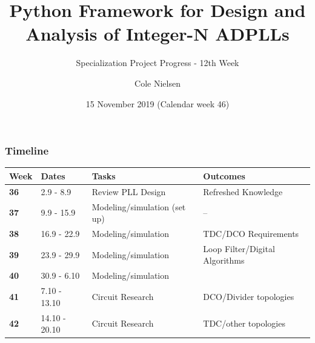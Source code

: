 \documentclass[t, screen, aspectratio=43]{beamer}
\title[Short title]{Python Framework for Design and Analysis of Integer-N ADPLLs}
\subtitle{Specialization Project Progress - 12th Week}
\author[C Nielsen]{Cole Nielsen}
\institute[NTNU]{Department of Electronic Systems, NTNU}
\date{15 November 2019 (Calendar week 46)}
\begin{document}
\begin{frame}
	\titlepage%
\end{frame}



\begin{frame}
	\frametitle{Timeline}
	\begin{table}[htb!]
		\tiny
		\centering
		\vspace{-1em}
		\def\arraystretch{1.5}		
		\setlength\arrayrulewidth{0.75pt}
		\setlength{\tabcolsep}{1em} %
		\begin{tabular}{|l|l|l|l|}
			\hline 
			\rule[-1ex]{0pt}{2.5ex} \cellcolor{gray!40}\textbf{Week} & \cellcolor{gray!40}\textbf{Dates} &\cellcolor{gray!40}\textbf{Tasks} & \cellcolor{gray!40}\textbf{Outcomes}\\ 
			\hline 
			\rule[-1ex]{0pt}{2.5ex} \cellcolor{red!20}\textbf{36}& \cellcolor{red!20}2.9 - 8.9 & \cellcolor{red!20}Review PLL Design & \cellcolor{red!20}Refreshed Knowledge\\ 
			\hline 
			\rule[-1ex]{0pt}{2.5ex} \cellcolor{red!20}\textbf{37}& \cellcolor{red!20}9.9 - 15.9 & \cellcolor{red!20}Modeling/simulation (set up) & \cellcolor{red!20}--\\ 
			\hline 
			\rule[-1ex]{0pt}{2.5ex} \cellcolor{red!20}\textbf{38}& \cellcolor{red!20}16.9 - 22.9 & \cellcolor{red!20}Modeling/simulation &\cellcolor{red!20}TDC/DCO Requirements\\ 
			\hline 
			\rule[-1ex]{0pt}{2.5ex} \cellcolor{red!20}\textbf{39}& \cellcolor{red!20}23.9 - 29.9& \cellcolor{red!20}Modeling/simulation& \cellcolor{red!20}Loop Filter/Digital Algorithms\\ 
			\hline 
			\rule[-1ex]{0pt}{2.5ex} \cellcolor{red!20}\textbf{40}& \cellcolor{red!20}30.9 - 6.10& \cellcolor{red!20}Modeling/simulation& \cellcolor{red!20}{Loop filter, DCO, TDC, calibration}\color{black}\\ 
			\hline 
			\rule[-1ex]{0pt}{2.5ex} \cellcolor{red!20}\textbf{41}&\cellcolor{red!20}7.10 - 13.10&\cellcolor{red!20}Circuit Research &\cellcolor{red!20}DCO/Divider topologies\\ 
			\hline 
			\rule[-1ex]{0pt}{2.5ex} \cellcolor{red!20}\textbf{42}&\cellcolor{red!20}14.10 - 20.10&\cellcolor{red!20}Circuit Research &\cellcolor{red!20}TDC/other topologies\\ 

\end{tabular}
\end{table}
\end{frame}
\end{document}
